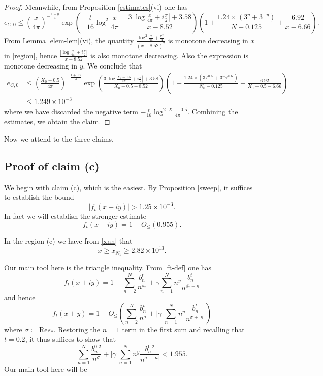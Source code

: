 \documentclass[a4paper,11pt,twoside]{amsart}
\begin{document}
\begin{proof}
Meanwhile, from Proposition \ref{estimates}(vi) one has
$$ e_{C,0} \leq \left(\frac{x}{4\pi}\right)^{-\frac{1+y}{4}} \exp\left( - \frac{t}{16} \log^2 \frac{x}{4\pi} + \frac{3 |\log \frac{x}{4\pi} + i \frac{\pi}{2}|+3.58}{x-8.52} \right) \left(1 + \frac{1.24 \times (3^y+3^{-y})}{N-0.125} + \frac{6.92}{x-6.66}\right).$$
From Lemma \ref{elem-lem}(vi), the quantity $\frac{\log^2 \frac{x}{4\pi} + \frac{\pi^2}{4}}{(x-8.52)^2}$ is monotone decreasing in $x$ in \eqref{region}, hence $\frac{|\log \frac{x}{4\pi} + i \frac{\pi}{2}|}{x-8.52}$ is also monotone decreasing.  Also the expression is monotone decreasing in $y$. We conclude that
\begin{equation}\label{ec0-bound}
\begin{split}
 e_{C,0} &\leq \left(\frac{X_0-0.5}{4\pi}\right)^{-\frac{1+0.2}{4}} \exp\left( \frac{3 |\log \frac{X_0-0.5}{4\pi} + i \frac{\pi}{2}|+3.58}{X_0-0.5-8.52} \right) \left(1 + \frac{1.24 \times (3^{\sqrt{0.6}}+3^{-\sqrt{0.6}})}{N_0-0.125} + \frac{6.92}{X_0-0.5-6.66}\right) \\
&\leq 1.249 \times 10^{-3}
\end{split}
\end{equation}
where we have discarded the negative term $- \frac{t}{16} \log^2 \frac{X_0-0.5}{4\pi}$.  Combining the estimates, we obtain the claim.
\end{proof}

Now we attend to the three claims.


\subsection{Proof of claim (c)}\label{c-bound}  

We begin with claim (c), which is the easiest.  
By Proposition \ref{sweep}, it suffices to establish the bound
$$ |f_t(x+iy)| > 1.25 \times 10^{-3}.$$
In fact we will establish the stronger estimate
\begin{equation}\label{ft0}
f_t(x+iy) = 1 + O_{\leq}( 0.955 ).
\end{equation}

In the region (c) we have from \eqref{xnn} that
$$ x \geq x_{N_1} \geq  2.82 \times 10^{13}.$$

Our main tool here is the triangle inequality.  From \eqref{ft-def} one has
$$
f_t(x+iy) = 1 + \sum_{n=2}^N \frac{b_n^t}{n^{s_*}} + \gamma \sum_{n=1}^N n^y \frac{b_n^t}{n^{\overline{s_*} + \kappa}}$$
and hence
$$ f_t(x+y) = 1 + O_{\leq}\left( \sum_{n=2}^N \frac{b_n^t}{n^{\sigma}} + |\gamma| \sum_{n=1}^N n^y \frac{b_n^t}{n^{\sigma + |\kappa|}} \right)$$
where $\sigma \coloneqq \mathrm{Re} s_*$.  Restoring the $n=1$ term in the first sum and recalling that $t=0.2$, it thus suffices to show that
\begin{equation}\label{nan}
 \sum_{n=1}^N \frac{b_n^{0.2}}{n^\sigma} + |\gamma| \sum_{n=1}^N n^y \frac{b_n^{0.2}}{n^{\sigma-|\kappa|}}
< 1.955.
\end{equation}
Our main tool here will be 
\end{document}
